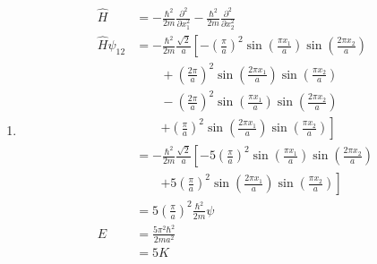 \documentclass{article}
\begin{document}
\begin{enumerate}
  \item

        \begin{align*}
          \hat{H}            & = -\frac{\hbar^2}{2 m} \frac{\partial^2}{\partial x_1^2} - \frac{\hbar^2}{2 m} \frac{\partial^2}{\partial x_2^2}                                                         \\
          \hat{H} \psi_{1 2} & = -\frac{\hbar^2}{2 m} \frac{\sqrt{2}}{a} \left[ -\left( \frac{\pi}{a} \right)^2 \sin \left( \frac{\pi x_1}{a} \right) \sin \left( \frac{2 \pi x_2}{a} \right) \right.   \\
                             & \qquad + \left( \frac{2 \pi}{a} \right)^2 \sin \left( \frac{2 \pi x_1}{a} \right) \sin \left( \frac{\pi x_2}{a} \right)                                                  \\
                             & \qquad - \left( \frac{2 \pi}{a} \right)^2 \sin \left( \frac{\pi x_1}{a} \right) \sin \left( \frac{2 \pi x_2}{a} \right)                                                  \\
                             & \qquad \left. + \left( \frac{\pi}{a} \right)^2 \sin \left( \frac{2 \pi x_1}{a} \right) \sin \left( \frac{\pi x_2}{a} \right) \right]                                     \\
                             & = -\frac{\hbar^2}{2 m} \frac{\sqrt{2}}{a} \left[ -5 \left( \frac{\pi}{a} \right)^2 \sin \left( \frac{\pi x_1}{a} \right) \sin \left( \frac{2 \pi x_2}{a} \right) \right. \\
                             & \qquad \left. + 5 \left( \frac{\pi}{a} \right)^2 \sin \left( \frac{2 \pi x_1}{a} \right) \sin \left( \frac{\pi x_2}{a} \right) \right]                                   \\
                             & = 5 \left( \frac{\pi}{a} \right)^2 \frac{\hbar^2}{2m} \psi                                                                                                               \\
          E                  & = \frac{5 \pi^2 \hbar^2}{2 m a^2}                                                                                                                                        \\
                             & = 5 K
        \end{align*}
\end{enumerate}

\subsection{}
\end{document}
